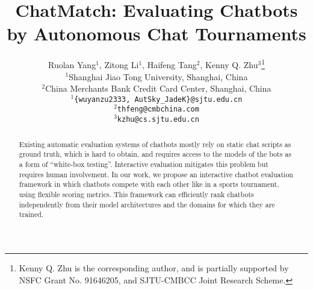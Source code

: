 \documentclass[11pt]{article}
\title{ChatMatch: Evaluating Chatbots by Autonomous Chat Tournaments}
\author{Ruolan Yang$^1$, Zitong Li$^1$, Haifeng Tang$^2$, Kenny Q. Zhu$^3$\thanks{\hspace{2mm}Kenny Q. Zhu is the corresponding author, and is partially
supported by NSFC Grant No. 91646205, and SJTU-CMBCC Joint Research Scheme.}\\
$^1$Shanghai Jiao Tong University, Shanghai, China \\
$^2$China Merchants Bank Credit Card Center, Shanghai, China \\
\texttt{$^1$\{wuyanzu2333, AutSky\_JadeK\}@sjtu.edu.cn} \\
\texttt{$^2$thfeng@cmbchina.com}\\ 
\texttt{$^3$kzhu@cs.sjtu.edu.cn}\\
}
\begin{document}
\maketitle
\begin{abstract}
Existing automatic evaluation systems of chatbots mostly rely on static chat 
scripts as ground truth, which is hard to obtain, and requires access to the
models of the bots as a form of ``white-box testing''. 
Interactive evaluation mitigates this problem but requires human
involvement. In our work, we propose an interactive chatbot evaluation 
framework in which chatbots compete with each other like in 
a sports tournament, using flexible scoring metrics. 
This framework can efficiently rank chatbots independently
from their model architectures and the domains for which they are trained.

\end{abstract}









\appendix

\end{document}
